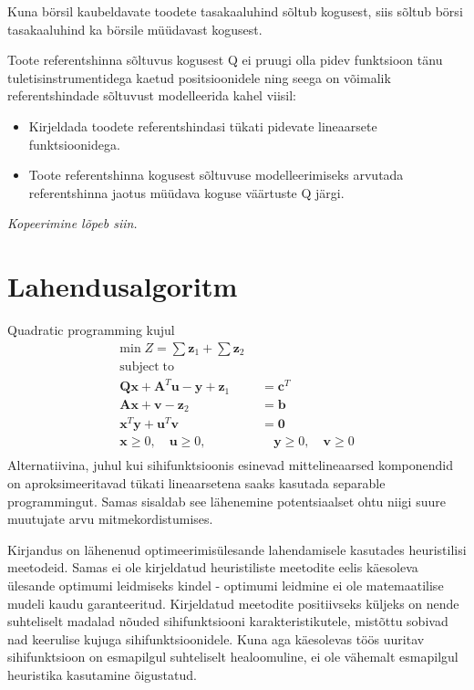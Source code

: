 \documentclass[twosided, 10pt, a4paper]{article}
\begin{document}
Kuna b\"orsil kaubeldavate toodete tasakaaluhind s\~oltub kogusest, siis s\~oltub b\"orsi tasakaaluhind ka b\"orsile m\"u\"udavast kogusest.

Toote referentshinna s\~oltuvus kogusest Q ei pruugi olla pidev funktsioon t\"anu tuletisinstrumentidega kaetud positsioonidele ning seega on võimalik referentshindade s\~oltuvust modelleerida kahel viisil:
\begin{itemize}
\item Kirjeldada toodete referentshindasi t\"ukati pidevate lineaarsete funktsioonidega.
\item Toote referentshinna kogusest s\~oltuvuse modelleerimiseks arvutada referentshinna jaotus m\"u\"udava koguse v\"a\"artuste Q j\"argi. 
\end{itemize}
\emph{Kopeerimine l\~opeb siin.}

\section {Lahendusalgoritm}
Quadratic programming kujul
\begin{align}
\mathrm{min}\; Z = \sum\mathbf{z}_1 + \sum\mathbf{z}_2 &\nonumber \\
\mathrm{subject \; to}\qquad \qquad\qquad  &\nonumber\\
\mathbf{Qx} + \mathbf{A}^T\mathbf{u} - \mathbf{y} + \mathbf{z}_1 &= \mathbf{c}^T \nonumber\\
\mathbf{Ax} + \mathbf{v} - \mathbf{z}_2 &= \mathbf{b} \nonumber \\
\mathbf{x}^T\mathbf{y} + \mathbf{u}^T\mathbf{v} &= \mathbf{0} \nonumber \\
\mathbf{x} \ge 0, \quad\mathbf{u} \ge 0, & \quad\mathbf{y} \ge 0, \quad\mathbf{v} \ge 0 \nonumber \\
\nonumber
\end{align}
Alternatiivina, juhul kui sihifunktsioonis esinevad mittelineaarsed komponendid on aproksimeeritavad t\"u\-ka\-ti lineaarsetena saaks kasutada separable programmingut. Samas sisaldab see l\"a\-he\-ne\-mi\-ne potentsiaalset ohtu niigi suure muutujate arvu mitmekordistumises.

Kirjandus on l\"ahenenud optimeerimis\"ulesande lahendamisele kasutades heuristilisi meetodeid\cite{sriyanyong}\cite{zhang}. Samas ei ole kirjeldatud heuristiliste meetodite eelis k\"aesoleva \"ulesande optimumi leidmiseks kindel - optimumi leidmine ei ole matemaatilise mudeli kaudu garanteeritud. Kirjeldatud meetodite positiivseks k\"uljeks on nende suhteliselt madalad n\~ouded sihifunktsiooni karakteristikutele, mist\~ottu sobivad nad keerulise kujuga sihifunktsioonidele. Kuna aga k\"aesolevas t\"o\"os uuritav sihifunktsioon on esmapilgul suhteliselt healoomuline, ei ole v\"ahemalt esmapilgul heuristika kasutamine \~oigustatud.
\end{document}
